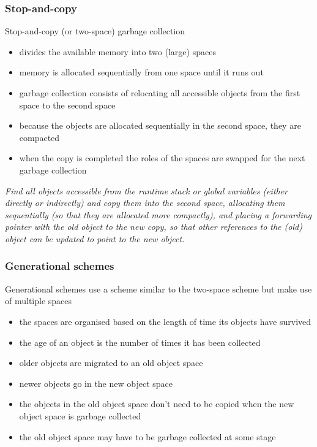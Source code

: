 \documentclass[fontsize=10pt,a4paper]{article}
\begin{document}
\begin{multicols}{3}
    \subsubsection{Stop-and-copy}

    Stop-and-copy (or two-space) garbage collection

    \begin{itemize}
        \item divides the available memory into two (large) spaces
        \item memory is allocated sequentially from one space until it runs out
        \item garbage collection consists of relocating all accessible objects from the first space to the second space
        \item because the objects are allocated sequentially in the second space, they are compacted
        \item when the copy is completed the roles of the spaces are swapped for the next garbage collection
    \end{itemize}

    \textit{Find all objects accessible from the runtime stack or global variables (either directly or indirectly) and copy them into the second space, allocating them sequentially (so that they are allocated more compactly), and placing a forwarding pointer with the old object to the new copy, so that other references to the (old) object can be updated to point to the new object.}

    \subsubsection{Generational schemes}

    Generational schemes use a scheme similar to the two-space scheme but make use of multiple spaces

    \begin{itemize}
        \item the spaces are organised based on the length of time its objects have survived
        \item the age of an object is the number of times it has been collected
        \item older objects are migrated to an old object space
        \item newer objects go in the new object space
        \item the objects in the old object space don’t need to be copied when the new object space is garbage collected
        \item the old object space may have to be garbage collected at some stage
    \end{itemize}


\end{multicols}
\end{document}

